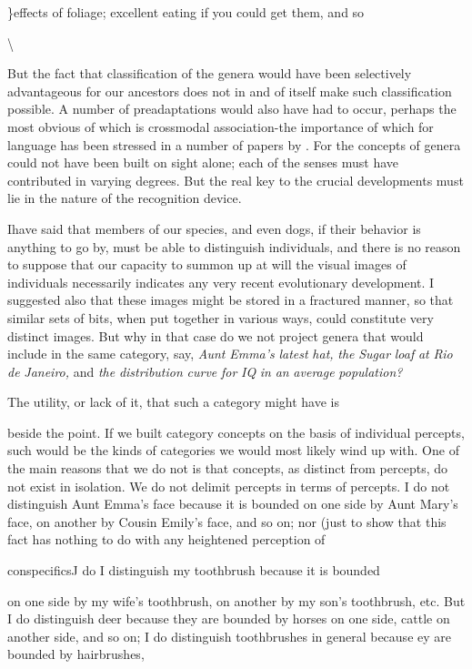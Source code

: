 \}effects of foliage; excellent eating if you could get them, and so

{\textbackslash}


But the fact that classification of the genera would have been selectively advantageous for our ancestors does not in and of itself make such classification possible. A number of preadaptations would also have had to occur, perhaps the most obvious of which is cross\-modal association-the importance of which for language has been stressed in a number of papers by \citet{Geschwind1974}. For the concepts of genera could not have been built on sight alone; each of the senses must have contributed in varying degrees. But the real key to the crucial developments must lie in the nature of the recognition device.

Ihave said that members of our species, and even dogs, if their behavior is anything to go by, must be able to distinguish individuals, and there is no reason to suppose that our capacity to summon up at will the visual images of individuals necessarily indicates any very recent evolutionary development. I suggested also that these images might be stored in a fractured manner, so that similar sets of bits, when put together in various ways, could constitute very distinct images. But why in that case do we not project genera that would include in the same category, say, \textit{Aunt} \textit{Emma's} \textit{latest} \textit{hat,} \textit{the} \textit{Sugar\-} \textit{loaf} \textit{at} \textit{Rio} \textit{de} \textit{Janeiro,} and \textit{the} \textit{distribution} \textit{curve} \textit{for} \textit{IQ} \textit{in} \textit{an} \textit{average} \textit{population?}

The utility, or lack of it, that such a category might have is

beside the point. If we built category concepts on the basis of in\-dividual percepts, such would be the kinds of categories we would most likely wind up with. One of the main reasons that we do not is that concepts, as distinct from percepts, do not exist in isolation. We do not delimit percepts in terms of percepts. I do not distinguish Aunt Emma's face because it is bounded on one side by Aunt Mary's face, on another by Cousin Emily's face, and so on; nor (just to show that this fact has nothing to do with any heightened perception of

conspecificsJ do I distinguish my toothbrush because it is bounded

on one side by my wife's toothbrush, on another by my son's tooth\-brush, etc. But I do distinguish deer because they are bounded by horses on one side, cattle on another side, and so on; I do distinguish toothbrushes in general because ey are bounded by hairbrushes,

